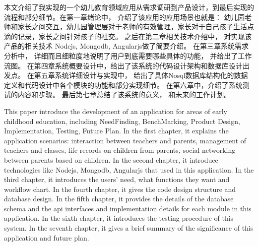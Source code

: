 
\begin{cnabstract}
本文介绍了我实现的一个幼儿教育领域应用从需求调研到产品设计，到最后实现的流程和部分细节。在第一章绪论中， 介绍了该应用的应用场景也就是： 幼儿园老师和家长之间交互，幼儿园管理层对于老师的有效管理，家长对于自己孩子生活点滴的记录，家长之间针对孩子的社交。  之后在第二章相关技术介绍中， 对实现该产品的相关技术 Nodejs, Mongodb, Angularjs做了简要介绍。 在第三章系统需求分析中， 详细而且细粒度地说明了用户到底需要哪些具体的功能， 并给出了工作流图。 在第四章系统概要设计中，给出了该系统的代码设计架构和数据库设计出发点。  在第五章系统详细设计与实现中， 给出了具体Nosql数据库结构化的数据定义和代码设计中各个模块的功能和部分实现细节。 在第六章中，介绍了系统测试的内容和步骤。 最后第七章总结了该系统的意义， 和未来的工作计划。

\end{cnabstract}


\begin{enabstract}

This paper introduce the development of an application for areas of early childhood education, including NeedFinding, BenchMarking, Product Design, Implementation, Testing, Future Plan.  In the first chapter, it explains the application scenarios: interaction between teachers and parents, management of teachers and classes, life records on children from parents, social networking between parents based on children.  In the second chapter, it introduce technologies like Nodejs, Mongodb, Angularjs that used in this application. In the third chapter, it introduces the users' need, what functions they want and workflow chart.  In the fourth chapter, it gives the code design structure and database design. In the fifth chapter, it provides the details of the database schema and the api interfaces and implementation details for each module in this application. In the sixth chapter,  it introduces the testing procedure of this system. In the seventh chapter, it gives a brief summary of the significance
of this application and future plan.

\end{enabstract}
